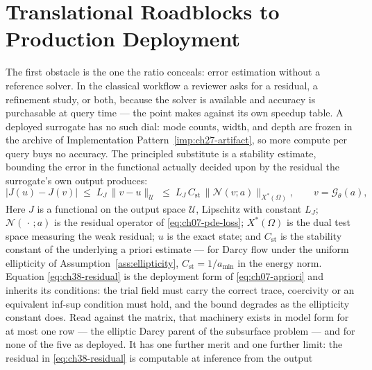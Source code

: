 \section{Translational Roadblocks to Production Deployment}
\label{sec:ch38-roadblocks}

The first obstacle is the one the ratio conceals: error estimation without a reference
solver. In the classical workflow a reviewer asks for a residual, a refinement study, or
both, because the solver is available and accuracy is purchasable at query
time --- the point  makes against
its own speedup table. A deployed surrogate has no such dial: mode counts, width, and depth
are frozen in the archive of Implementation Pattern~\ref{imp:ch27-artifact}, so more compute
per query buys no accuracy. The principled substitute is a stability estimate, bounding the
error in the functional actually decided upon by the residual the surrogate's own output
produces:
\begin{equation}
  \big|J(u)-J(v)\big|
  \;\le\;
  L_J\,\big\|v-u\big\|_{\mathcal{U}}
  \;\le\;
  L_J\,C_{\mathrm{st}}\,\big\|\mathcal{N}(v;a)\big\|_{X^{*}(\Omega)},
  \qquad v = \mathcal{G}_{\theta}(a),
  \label{eq:ch38-residual}
\end{equation}
Here $J$ is a functional on the output space $\mathcal{U}$, Lipschitz with constant $L_J$;
$\mathcal{N}(\,\cdot\,;a)$ is the residual operator of \eqref{eq:ch07-pde-loss}; $X^{*}(\Omega)$
is the dual test space measuring the weak residual; $u$ is the exact state; and
$C_{\mathrm{st}}$ is the stability constant of the underlying a priori estimate --- for Darcy
flow under the uniform ellipticity of Assumption~\ref{ass:ellipticity},
$C_{\mathrm{st}}=1/a_{\min}$ in the energy norm. Equation \eqref{eq:ch38-residual} is the
deployment form of \eqref{eq:ch07-apriori} and inherits its conditions: the trial field must
carry the correct trace, coercivity or an equivalent inf-sup condition must hold, and the
bound degrades as the ellipticity constant does. Read against the matrix, that machinery
exists in model form for at most one row --- the elliptic Darcy parent of the subsurface
problem --- and for none of the five as deployed. It has one further merit and one further
limit: the residual in \eqref{eq:ch38-residual} is computable at inference from the output
